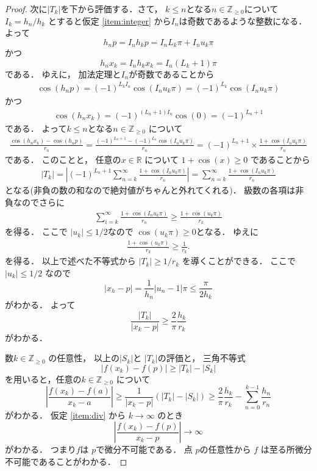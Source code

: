 \documentclass[leqno, a4paper, 12pt]{jsarticle}
\newcommand{\zz}{\mathbb{Z}}
\newcommand{\rr}{\mathbb{R}}
\begin{document}
\begin{proof}
次に$|T_{k}|$を下から評価する．さて，
$k\le n$となる$n\in \zz_{\ge 0}$について
$I_{k}=h_{n}/h_{k}$
とすると仮定
\ref{item:integer}
から$I_{n}$は奇数であるような整数になる．
よって
\[
h_{n}p=I_{n}h_{k}p=I_{n}L_{k}\pi +I_{n}u_{k}\pi
\]
かつ
\[
h_{n}x_{k}=I_{n}h_{k}x_{k}=I_{n}(L_{k}+1)\pi
\]
である．
ゆえに，
加法定理と$I_{n}$が奇数であることから
\begin{align*}
\cos(h_{n}p)=(-1)^{L_{k}I_{n}}\cos(I_{n}u_{k}\pi)
=(-1)^{L_{k}}\cos(I_{n}u_{k}\pi)
\end{align*}
かつ
\begin{align*}
\cos(h_{n}x_{k})=(-1)^{(L_{n}+1)I_{n}}\cos(0)=(-1)^{L_{n}+1}
\end{align*}
である．
よって$k\le n$となる$n\in \zz_{\ge 0}$
について
\begin{align*}
\frac{\cos(h_{n}x_{k})-\cos(h_{n}p)}{r_{n}}=
\frac{(-1)^{L_{n}+1}-(-1)^{L_{n}}\cos(I_{n}u_{k}\pi)}{r_{n}}
=
(-1)^{L_{n}+1}\times \frac{1+\cos(I_{n}u_{k}\pi)}{r_{n}}
\end{align*}
である．
このことと，
任意の$x\in \rr$
について
$1+\cos(x)\ge 0$
であることから
\begin{align*}
|T_{k}|
=
\left|(-1)^{L_{n}+1}\sum_{n=k}^{\infty}
\frac{1+\cos(I_{n}u_{k}\pi)}{r_{n}}\right|
=\sum_{n=k}^{\infty}\frac{1+\cos(I_{n}u_{k}\pi)}{r_{n}}
\end{align*}
となる(非負の数の和なので絶対値がちゃんと外れてくれる)．
級数の各項は非負なのでさらに
\begin{align*}
\sum_{i=k}^{\infty}\frac{1+\cos(I_{n}u_{k}\pi)}{r_{n}}
\ge 
\frac{1+\cos(u_{k}\pi)}{r_{k}}
\end{align*}
を得る．
ここで
$|u_{k}|\le 1/2$なので
$\cos(u_{k}\pi)\ge 0$となる．
ゆえに
\begin{align*}
\frac{1+\cos(u_{k}\pi)}{r_{k}}\ge 
\frac{1}{r_{k}}.  
\end{align*}
を得る．
以上で述べた不等式から
$|T_{k}|\ge 1/r_{k}$
を導くことができる．
ここで$|u_{k}|\le 1/2$
なので
\[
|x_{h}-p|=\frac{1}{h_{n}}|u_{n}-1|\pi\le \frac{\pi}{2h_{k}}
\]
がわかる．
よって
\[
\frac{|T_{k}|}{|x_{k}-p|}
\ge 
 \frac{2}{\pi}\frac{h_{k}}{r_{k}}
\]
がわかる．

数$k\in \zz_{\ge 0}$
の任意性，
以上の$|S_{k}|$と
$|T_{k}|$の評価と，
三角不等式
\[
|f(x_{k})-f(p)|\ge |T_{k}|-|S_{k}|
\]
を用いると，任意の$k\in \zz_{\ge 0}$
について
\[
\left|\frac{f(x_{k})-f(a)}{x_{k}-a}\right|\ge
\frac{1}{|x_{k}-p|}(|T_{k}|-|S_{k}|)
\ge  
\frac{2}{\pi}\frac{h_{k}}{r_{k}}
-
\sum_{n=0}^{k-1}\frac{h_{n}}{r_{n}}
\]
がわかる．
仮定
\ref{item:div}
から
$k\to \infty$
のとき
\[
\left|\frac{f(x_{k})-f(p)}{x_{k}-p}\right|\to \infty
\]
がわかる．
つまり$f$は
$p$で微分不可能である．
点
$p$の任意性から
$f$
は至る所微分不可能であることがわかる．
\end{proof}
\end{document}
